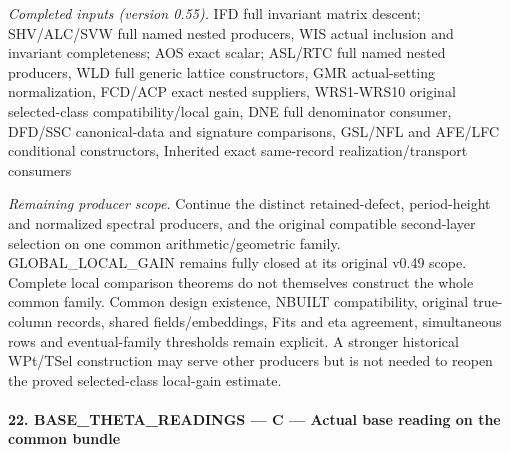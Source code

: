 \documentclass[11pt,a4paper]{article}
\numberwithin{equation}{section}
\theoremstyle{remark}\newtheorem{remark}[theorem]{Remark}
\begin{document}
\emph{Completed inputs (version 0.55).} IFD full invariant matrix descent; SHV/ALC/SVW full named nested producers, WIS actual inclusion and invariant completeness; AOS exact scalar; ASL/RTC full named nested producers, WLD full generic lattice constructors, GMR actual-setting normalization, FCD/ACP exact nested suppliers, WRS1-WRS10 original selected-class compatibility/local gain, DNE full denominator consumer, DFD/SSC canonical-data and signature comparisons, GSL/NFL and AFE/LFC conditional constructors, Inherited exact same-record realization/transport consumers

\emph{Remaining producer scope.} Continue the distinct retained-defect, period-height and normalized spectral producers, and the original compatible second-layer selection on one common arithmetic/geometric family. GLOBAL\_\allowbreak LOCAL\_\allowbreak GAIN remains fully closed at its original v0.49 scope. Complete local comparison theorems do not themselves construct the whole common family. Common design existence, NBUILT compatibility, original true-column records, shared fields/embeddings, Fits and eta agreement, simultaneous rows and eventual-family thresholds remain explicit. A stronger historical WPt/TSel construction may serve other producers but is not needed to reopen the proved selected-class local-gain estimate.



\paragraph{22. BASE\_\allowbreak THETA\_\allowbreak READINGS — C — Actual base reading on the common bundle}
\end{document}

